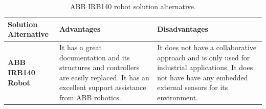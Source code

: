 \documentclass[11pt]{report} %
\begin{document}
\begin{table}[H]
\begin{center}
    \begin{tabular}{M{6.6cm}M{3.3cm}M{3.3cm}}
    \hline
    \textbf{Solution Alternative} & \textbf{Advantages} & \textbf{Disadvantages} \\ 
    \hline
    
    \textbf{ABB IRB140 Robot}

    
    \citep{cite_abb_robots}

    &
    
    It has a great documentation and its structures and controllers are easily replaced. It has an excellent support assistance from ABB robotics.
    
    &
    
    It does not have a collaborative approach and is only used for industrial applications. It does not have  have any embedded external sensors for its environment.
    
    \\ \hline
    \end{tabular}
\caption{\label{tab:abb} ABB IRB140 robot solution alternative.}
\end{center}
\end{table}
\end{document}
